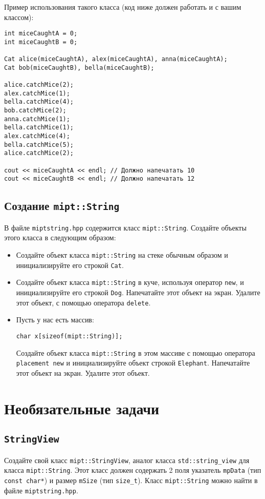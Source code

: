 \documentclass{article}
\begin{document}
Пример использования такого класса (код ниже должен работать и с вашим классом):

\begin{lstlisting}
int miceCaughtA = 0;
int miceCaughtB = 0;

Cat alice(miceCaughtA), alex(miceCaughtA), anna(miceCaughtA);
Cat bob(miceCaughtB), bella(miceCaughtB);

alice.catchMice(2);
alex.catchMice(1);
bella.catchMice(4);
bob.catchMice(2);
anna.catchMice(1);
bella.catchMice(1);
alex.catchMice(4);
bella.catchMice(5);
alice.catchMice(2);

cout << miceCaughtA << endl; // Должно напечатать 10
cout << miceCaughtB << endl; // Должно напечатать 12
\end{lstlisting}


\subsection{Создание \texttt{mipt::String}}
В файле \texttt{miptstring.hpp} содержится класс \texttt{mipt::String}. Создайте объекты этого класса в следующим образом:
\begin{itemize}
\item Создайте объект класса \texttt{mipt::String} на стеке обычным образом и инициализируйте его строкой \texttt{Cat}.
\item Создайте объект класса \texttt{mipt::String} в куче, используя оператор \texttt{new}, и инициализируйте его строкой \texttt{Dog}. Напечатайте этот объект на экран. Удалите этот объект, с помощью оператора \texttt{delete}.
\item Пусть у нас есть массив:
\begin{lstlisting}
char x[sizeof(mipt::String)];
\end{lstlisting}
Создайте объект класса \texttt{mipt::String} в этом массиве с помощью оператора \texttt{placement new} и инициализируйте объект строкой \texttt{Elephant}. Напечатайте этот объект на экран. Удалите этот объект.
\end{itemize}






\newpage
\quad
\newpage
\section{Необязательные задачи}
\subsection{\texttt{StringView}}
Создайте свой класс \texttt{mipt::StringView}, аналог класса \texttt{std::string\_view} для класса \texttt{mipt::String}.
Этот класс должен содержать 2 поля указатель \texttt{mpData} (тип \texttt{const char*}) и размер \texttt{mSize} (тип \texttt{size\_t}). Класс \texttt{mipt::String} можно найти в файле \texttt{miptstring.hpp}.\\
\end{document}
